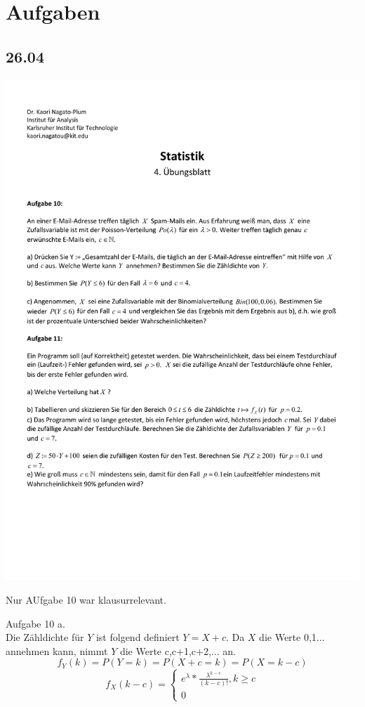 \section{Aufgaben}

\subsection{26.04}
\includegraphics[scale=0.75,page=1]{input/grahix/Aufgabenblatt4.pdf}

Nur AUfgabe 10 war klausurrelevant.

Aufgabe 10 a.\\

Die Zähldichte für $Y$ ist folgend definiert $Y = X+c$. Da $X$ die Werte 0,1... annehmen kann, nimmt $Y$ die Werte c,c+1,c+2,... an. \\

\[f_Y(k)=P(Y=k)=P(X+c=k)=P(X=k-c)\]
\[f_X(k-c)=\begin{cases}e^{\lambda}*\frac{\lambda^{k-c}}{(k-c)!},k\geq c\\
0\end{cases}\]


